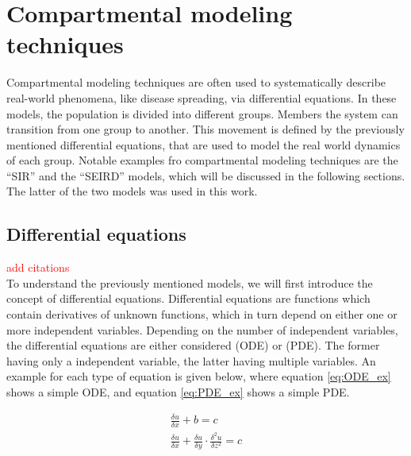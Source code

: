 \section{Compartmental modeling techniques}
Compartmental modeling techniques are often used to systematically describe real-world phenomena,
like disease spreading, via differential equations\cite{kermack1991contribution,skendall1956deterministic}. In these models, the population is divided into different groups. 
Members the system can transition from one group to another. This movement is defined by the previously mentioned differential equations, that are used to model the real
world dynamics of each group. Notable examples fro compartmental modeling techniques are the ``SIR'' and the ``SEIRD'' models, which will be discussed in
the following sections. The latter of the two models was used in this work.


\subsection{Differential equations}
\textcolor{red}{add citations}\\ %
To understand the previously mentioned models, we will first introduce the concept of differential equations.
Differential equations are functions which contain derivatives of unknown functions, which in turn depend
on either one or more independent variables. Depending on the number of independent variables, the differential
equations are either considered  (ODE) or
 (PDE). The former having only a independent variable, the latter having multiple variables.
An example for each type of equation is given below, where equation \ref*{eq:ODE_ex} shows a simple ODE, and equation \ref*{eq:PDE_ex} shows a
simple PDE.\newline

\begin{align}
	\frac{\delta u}{\delta x} + b = c \label{eq:ODE_ex}\\
	\frac{\delta u}{\delta x} + \frac{\delta u}{\delta y} \cdot \frac{\delta^2 u}{\delta z^2} = c \label{eq:PDE_ex}
\end{align}


